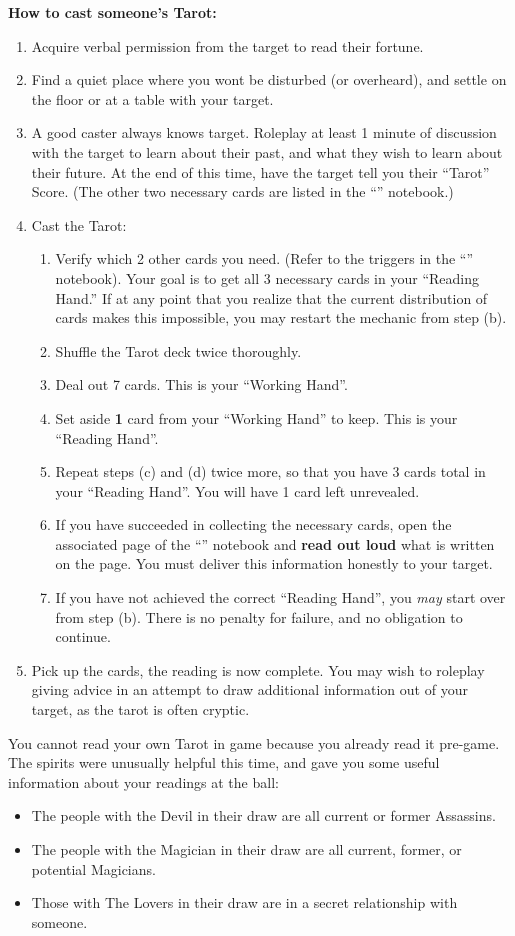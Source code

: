 \documentclass[green]{NeptuneBall}
\begin{document}
{\bf How to cast someone's Tarot:} %
\begin{enumerate}
  \item Acquire verbal permission from the target to read their fortune.
  \item Find a quiet place where you wont be disturbed (or overheard), and settle on the floor or at a table with your target.
  \item A good caster always knows \cSlave{\their} target. Roleplay at least 1 minute of discussion with the target to learn about their past, and what they wish to learn about their future. At the end of this time, have the target tell you their ``Tarot'' Score. (The other two necessary cards are listed in the ``\mTarot{\MYname}'' notebook.)
  \item Cast the Tarot:
  \begin{enumerate}
    \item Verify which 2 other cards you need. (Refer to the triggers in the ``\mTarot{\MYname}'' notebook). Your goal is to get all 3 necessary cards in your ``Reading Hand.'' If at any point that you realize that the current distribution of cards makes this impossible, you may restart the mechanic from step (b).
    \item Shuffle the Tarot deck twice thoroughly.
    \item Deal out 7 cards. This is your ``Working Hand''. 
    \item Set aside {\bf 1} card from your ``Working Hand'' to keep. This is your ``Reading Hand''.
    \item Repeat steps (c) and (d) twice more, so that you have 3 cards total in your ``Reading Hand''. You will have 1 card left unrevealed.
    \item If you have succeeded in collecting the necessary cards, open the associated page of the ``\mTarot{\MYname}'' notebook and {\bf read out loud} what is written on the page. You must deliver this information honestly to your target.
    \item If you have not achieved the correct ``Reading Hand'', you \emph{may} start over from step (b). There is no penalty for failure, and no obligation to continue.
  \end{enumerate}
  \item Pick up the cards, the reading is now complete. You may wish to roleplay giving advice in an attempt to draw additional information out of your target, as the tarot is often cryptic.
\end{enumerate}

You cannot read your own Tarot in game because you already read it pre-game. The spirits were unusually helpful this time, and gave you some useful information about your readings at the ball:

\begin{itemize}
\item The people with the Devil in their draw are all current or former Assassins.
\item The people with the Magician in their draw are all current, former, or potential Magicians.
\item Those with The Lovers in their draw are in a secret relationship with someone.
\end{itemize}
\end{document}
